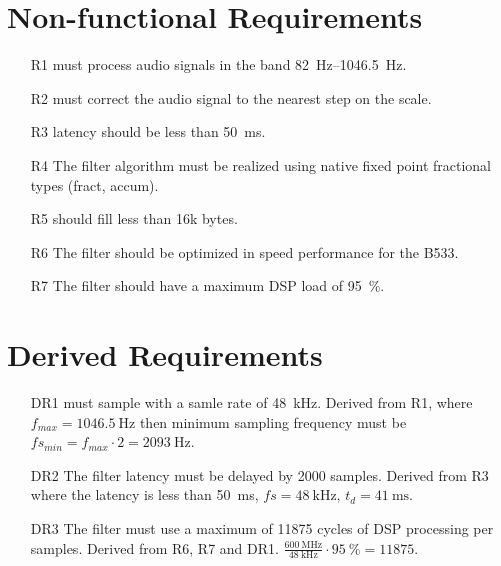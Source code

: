 \section{Non-functional Requirements}
\begin{itemize}
	\item[R1] \systemName must process audio signals in the band \SIrange{82}{1046.5}{\hertz}. 
	\item[R2] \systemName must correct the audio signal to the nearest step on the scale.
	\item[R3] \systemName latency should be less than \SI{50}{\milli\second}.
	\item[R4] The filter algorithm must be realized using native fixed point fractional types (fract, accum).
	\item[R5] \systemName should fill less than 16k bytes.
	\item[R6] The filter should be optimized in speed performance for the B533.
	\item[R7] The filter should have a maximum DSP load of \SI{95}{\percent}.
\end{itemize}

\section{Derived Requirements}
\begin{itemize}
	\item[DR1] \systemName must sample with a samle rate of \SI{48}{\kilo\hertz}.
	Derived from R1, where $f_{max}=\SI{1046.5}{\hertz}$ then minimum sampling frequency must be $fs_{min} = f_{max}\cdot 2 = \SI{2093}{\hertz}$.
	\item[DR2] The filter latency must be delayed by \num{2000} samples.
	Derived from R3 where the latency is less than \SI{50}{\milli\second}, $fs = \SI{48}{\kilo\hertz}$, $t_d = \SI{41}{\milli\second}$.
	\item[DR3] The filter must use a maximum of \num{11875} cycles of DSP processing per samples. Derived from R6, R7 and DR1.
	$\frac{\SI{600}{\mega\hertz}}{\SI{48}{\kilo\hertz}}\cdot\SI{95}{\percent} = \num{11875}$.
\end{itemize}